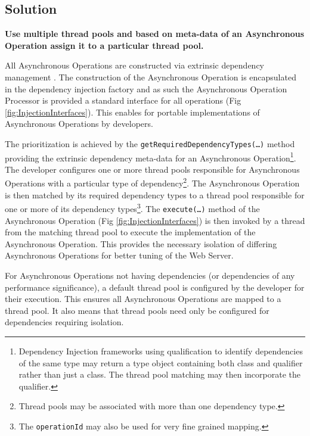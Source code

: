 \documentclass[prodmode]{style/acmlarge}
\begin{document}
\subsection{Solution}


\textbf{Use multiple thread pools and based on meta-data of an Asynchronous Operation assign it to a particular thread pool.}

All Asynchronous Operations are constructed via extrinsic dependency management
\cite{ioc}.  The construction of the Asynchronous Operation is encapsulated in
the dependency injection factory and as such the Asynchronous Operation
Processor is provided a standard interface for all operations (Fig
\ref{fig:InjectionInterfaces}).  This enables for portable implementations of
Asynchronous Operations by developers.

The prioritization is achieved by the
\texttt{getRequiredDependencyTypes(\ldots)} method providing the extrinsic
dependency meta-data for an Asynchronous Operation\footnote{Dependency Injection
frameworks using qualification to identify dependencies of the same type may
return a type object containing both class and qualifier rather than just a
class.  The thread pool matching may then incorporate the qualifier.}.
The developer configures one or more thread pools responsible for Asynchronous
Operations with a particular type of dependency\footnote{Thread pools may be
associated with more than one dependency type.}.  The Asynchronous Operation is
then matched by its required dependency types to a thread pool responsible for
one or more of its dependency types\footnote{The \texttt{operationId} may also
be used for very fine grained mapping.}.  The \texttt{execute(\ldots)} method of
the Asynchronous Operation (Fig \ref{fig:InjectionInterfaces}) is then invoked
by a thread from the matching thread pool to execute the implementation of the
Asynchronous Operation.  This provides the necessary isolation of differing
Asynchronous Operations for better tuning of the Web Server.

For Asynchronous Operations not having dependencies (or dependencies of any
performance significance), a default thread pool is configured by the developer
for their execution.  This ensures all Asynchronous Operations are mapped to a
thread pool.  It also means that thread pools need only be configured for
dependencies requiring isolation.
\end{document}
